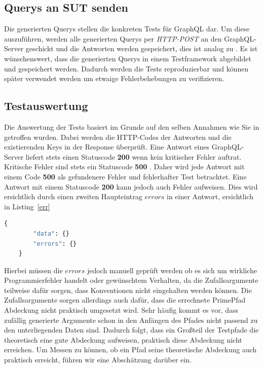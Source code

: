 \subsection{Querys an SUT senden}

Die generierten Querys stellen die konkreten Tests für GraphQL dar.
Um diese auszuführen, werden alle generierten Querys per \textit{HTTP-POST} an den GraphQL-Server geschickt und die Antworten
werden gespeichert, dies ist analog zu \cite{property-based-testing}.
Es ist wünschenswert, dass die generierten Querys in einem Testframework abgebildet und gespeichert werden.
Dadurch werden die Tests reproduzierbar und können später verwendet werden um etwaige Fehlerbehebungen zu verifizieren.

\subsection{Testauswertung}

Die Auswertung der Tests basiert im Grunde auf den selben Annahmen wie Sie in \cite{property-based-testing} getroffen wurden.
Dabei werden die HTTP-Codes der Antworten und die existierenden Keys in der Response überprüft.
Eine Antwort eines GraphQL-Server liefert stets einen Statuscode \textbf{200} wenn kein kritischer Fehler auftrat.
Kritische Fehler sind stets ein Statuscode \textbf{500} \cite[vgl. 7. Response]{graphqlspecification}.
Daher wird jede Antwort mit einem Code \textbf{500} als gefundenere Fehler und fehlerhafter Test betrachtet.
Eine Antwort mit einem Statuscode \textbf{200} kann jedoch auch Fehler aufweisen.
Dies wird ersichtlich durch einen zweiten Haupteintrag $errors$ in einer Antwort, ersichtlich in Listing~\ref{err}

\begin{lstlisting}[language=GraphQL, label={err}, caption={fehlerhafte Antwort}]
    {
        "data": {}
        "errors": {}
    }
\end{lstlisting}

Hierbei müssen die $errors$ jedoch manuell geprüft werden ob es sich um wirkliche Programmierfehler handelt oder gewünschtem Verhalten,
da die Zufallsargumente teilweise dafür sorgen, dass Konventionen nicht eingehalten werden können.
Die Zufallsargumente sorgen allerdings auch dafür, dass die errechnete PrimePfad Abdeckung nicht praktisch umgesetzt wird.
Sehr häufig kommt es vor, dass zufällig generierte Argumente schon in den Anfängen des Pfades nicht passend zu den unterliegenden Daten sind.
Dadurch folgt, dass ein Großteil der Testpfade die theoretisch eine gute Abdeckung aufweisen, praktisch diese Abdeckung nicht erreichen.
Um Messen zu können, ob ein Pfad seine theoretische Abdeckung auch praktisch erreicht, führen wir eine Abschätzung darüber ein.

